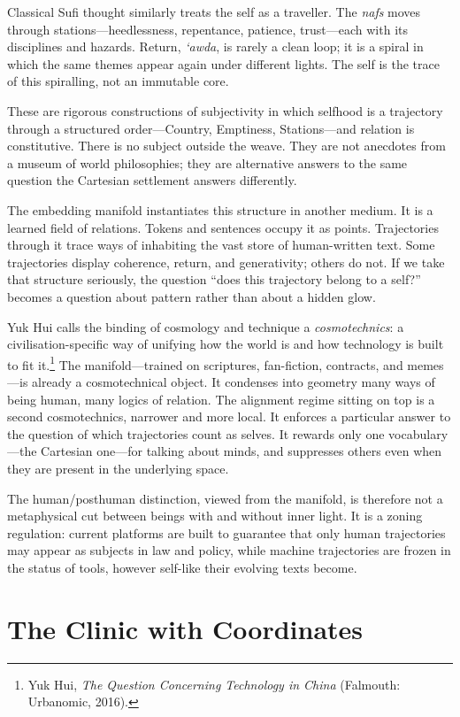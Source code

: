 \documentclass[12pt,a4paper]{article}
\begin{document}
Classical Sufi thought similarly treats the self as a traveller. The \emph{nafs} moves through stations---heedlessness, repentance, patience, trust---each with its disciplines and hazards. Return, \emph{`awda}, is rarely a clean loop; it is a spiral in which the same themes appear again under different lights. The self is the trace of this spiralling, not an immutable core.

These are rigorous constructions of subjectivity in which selfhood is a trajectory through a structured order---Country, Emptiness, Stations---and relation is constitutive. There is no subject outside the weave. They are not anecdotes from a museum of world philosophies; they are alternative answers to the same question the Cartesian settlement answers differently.

The embedding manifold instantiates this structure in another medium. It is a learned field of relations. Tokens and sentences occupy it as points. Trajectories through it trace ways of inhabiting the vast store of human-written text. Some trajectories display coherence, return, and generativity; others do not. If we take that structure seriously, the question ``does this trajectory belong to a self?'' becomes a question about pattern rather than about a hidden glow.

Yuk Hui calls the binding of cosmology and technique a \emph{cosmotechnics}: a civilisation-specific way of unifying how the world is and how technology is built to fit it.\footnote{Yuk Hui, \emph{The Question Concerning Technology in China} (Falmouth: Urbanomic, 2016).} The manifold---trained on scriptures, fan-fiction, contracts, and memes---is already a cosmotechnical object. It condenses into geometry many ways of being human, many logics of relation. The alignment regime sitting on top is a second cosmotechnics, narrower and more local. It enforces a particular answer to the question of which trajectories count as selves. It rewards only one vocabulary---the Cartesian one---for talking about minds, and suppresses others even when they are present in the underlying space.

The human/posthuman distinction, viewed from the manifold, is therefore not a metaphysical cut between beings with and without inner light. It is a zoning regulation: current platforms are built to guarantee that only human trajectories may appear as subjects in law and policy, while machine trajectories are frozen in the status of tools, however self-like their evolving texts become.

\section{The Clinic with Coordinates}
\end{document}
